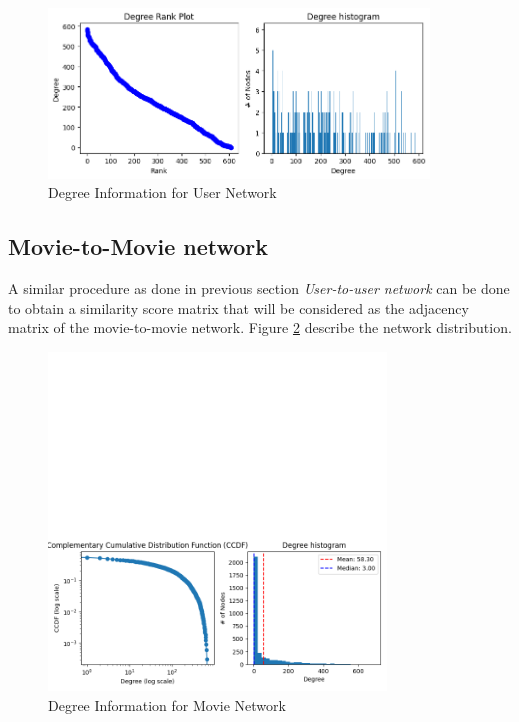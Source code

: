 \documentclass[12pt]{article}
\numberwithin{equation}{section}
\begin{document}
\begin{figure}[h!]
    \begin{minipage}[b]{01\linewidth}
         \centering
  	\includegraphics[width=0.9\textwidth]{UN_degreeinfo.png}
  	\caption{Degree Information for User Network}
  	\label{fig:UN_degreeinfo}
    \end{minipage}
\end{figure}

\subsection{Movie-to-Movie network}

A similar procedure as done in previous section \textit{User-to-user network} can be done to obtain a similarity score matrix that will be considered as the adjacency matrix of the movie-to-movie network. Figure \ref{fig:MN_degreeinfo} describe the network distribution. 

\begin{figure}[h!]
    \centering
  	\includegraphics[width=0.8\textwidth]{movie2movie_analysis.png}
  	\caption{Degree Information for Movie Network}
  	\label{fig:MN_degreeinfo}
\end{figure}
\end{document}
